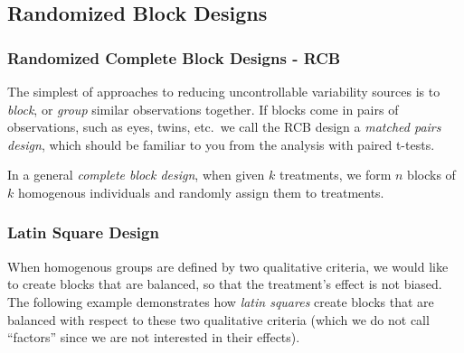 \subsection{Randomized Block Designs}


\subsubsection{Randomized Complete Block Designs - RCB}
The simplest of approaches to reducing uncontrollable variability sources is to \emph{block}, or \emph{group} similar observations together. 
If blocks come in pairs of observations, such as eyes, twins, etc.\, we call the RCB design a \emph{matched pairs design}, which should be familiar to you from the analysis with paired t-tests.

In a general \emph{complete block design}, when given $k$ treatments, we form $n$ blocks of $k$ homogenous individuals and randomly assign them to treatments. 




\subsubsection{Latin Square Design}
When homogenous groups are defined by two qualitative criteria, we would like to create blocks that are balanced, so that the treatment's effect is not biased.
The following example demonstrates how \emph{latin squares} create blocks that are balanced with respect to these two qualitative criteria (which we do not call ``factors'' since we are not interested in their effects). 


